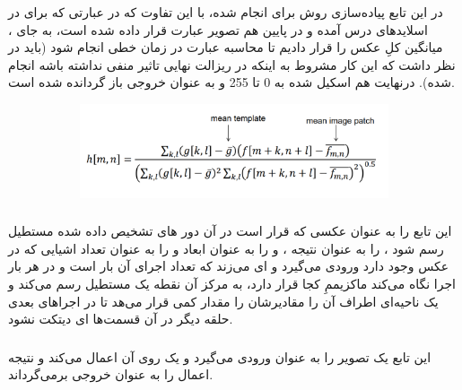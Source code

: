 \documentclass[a4paper,12pt]{article}
\begin{document}
 \subsubsection*{}
 در این تابع پیاده‌سازی روش 
برای 
انجام شده، با این تفاوت که در عبارتی که برای 
 در اسلاید‌های درس آمده و در پایین هم تصویر عبارت قرار داده شده است، به جای 
 ،‌ میانگین کلِ عکس را قرار دادیم تا محاسبه عبارت در زمان خطی انجام شود (‌باید در نظر داشت که این کار مشروط  به اینکه در ریزالت نهایی تاثیر منفی نداشته باشه انجام شده). درنهایت هم 
 اسکیل شده به 0 تا 255 و به عنوان خروجی باز گردانده شده است.
  \begin{figure}[H]
 	\centering
 	\begin{subfigure}{0.9\textwidth}
 		\centering
 		\includegraphics[width=\textwidth]{eq.png}
 	\end{subfigure}
 \end{figure}
 \subsubsection*{}
 این تابع 
 را به عنوان عکسی که قرار است در آن دور 
 های تشخیص داده شده مستطیل رسم شود ، 
 را به عنوان نتیجه 
 ،
 و
 را به عنوان ابعاد 
   و 
   را به عنوان تعداد اشیایی که در عکس وجود دارد ورودی می‌گیرد و 
   ای می‌زند که تعداد اجرای آن 
   بار است و در هر بار اجرا نگاه می‌کند ماکزیممِ
   کجا قرار دارد، به مرکز آن نقطه یک مستطیل رسم می‌کند و یک ناحیه‌ای اطراف آن را مقادیرشان را مقدار کمی قرار می‌هد تا در اجراهای بعدی حلقه دیگر در آن قسمت‌ها 
   ای دیتکت نشود.
   \subsubsection*{}
   این تابع یک تصویر را به عنوان ورودی می‌گیرد و یک 
   روی آن اعمال می‌کند و نتیجه اعمال را به عنوان خروجی بر‌می‌گرداند.
\end{document}
